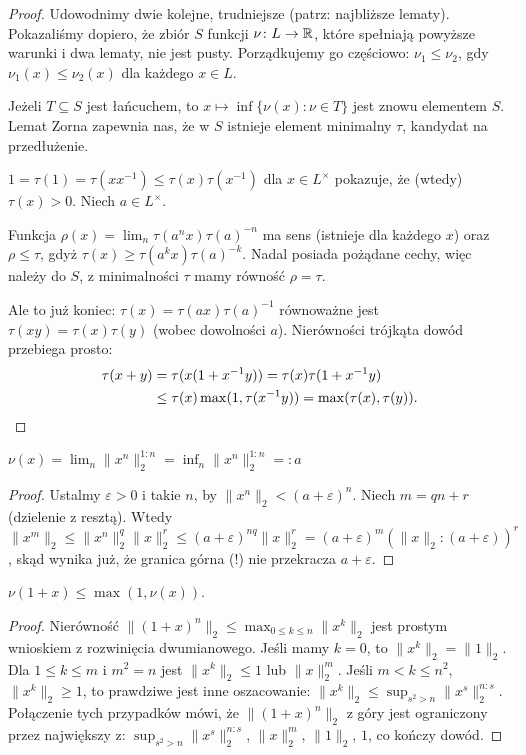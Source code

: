 \begin{proof}
	Udowodnimy dwie kolejne, trudniejsze (patrz: najbliższe lematy).
	Pokazaliśmy dopiero, że zbiór $S$ funkcji $\nu \colon L \to \mathbb R$, które spełniają powyższe warunki i dwa lematy, nie jest pusty.
	Porządkujemy go częściowo: $\nu_1 \le \nu_2$, gdy $\nu_1(x) \le \nu_2(x)$ dla każdego $x \in L$.
	
	Jeżeli $T \subseteq S$ jest łańcuchem, to $x \mapsto \inf \{\nu(x) : \nu \in T\}$ jest znowu elementem $S$.
	Lemat Zorna zapewnia nas, że w $S$ istnieje element minimalny $\tau$, kandydat na przedłużenie.

	$1 = \tau(1) = \tau(xx^{-1}) \le \tau(x) \tau(x^{-1})$ dla $x \in L^\times$ pokazuje, że (wtedy) $\tau (x) > 0$.
	Niech $a \in L^\times$.
	
	Funkcja $\rho(x) = \lim_n \tau(a^nx)\tau(a)^{-n}$ ma sens (istnieje dla każdego $x$) oraz $\rho \le \tau$, gdyż $\tau(x) \ge \tau(a^kx)\tau(a)^{-k}$.
	Nadal posiada pożądane cechy, więc należy do $S$, z minimalności $\tau$ mamy równość $\rho = \tau$.
	
	Ale to już koniec: $\tau(x) = \tau(ax) \tau(a)^{-1}$ równoważne jest $\tau(xy) = \tau(x) \tau(y)$ (wobec dowolności $a$).
	Nierówności trójkąta dowód przebiega prosto:
	\begin{align*}
		\tau(x + y) & = \tau(x(1 + x^{-1}y)) = \tau(x) \tau(1 + x^{-1}y) \\
		& \le \tau(x) \max (1, \tau(x^{-1}y))  = \max(\tau(x), \tau(y)). \qedhere
	\end{align*}
\end{proof}

\begin{lemat}
	$\nu(x) = \lim_n \|x^n\|_2^{1:n} = \inf_n \|x^n\|_2^{1:n} =: a$
\end{lemat}

\begin{proof}
	Ustalmy $\varepsilon > 0$ i takie $n$, by $\|x^n\|_2 < (a + \varepsilon)^n$.
	Niech $m = qn + r$ (dzielenie z resztą).
	Wtedy $\|x^m\|_2 \le \|x^n\|_2^q \|x\|_2^r \le (a + \varepsilon)^{nq} \|x\|_2^r = (a + \varepsilon)^m (\|x\|_2 : (a + \varepsilon))^r$,
	skąd wynika już, że granica górna (!) nie przekracza $a + \varepsilon$.
\end{proof}

\begin{lemat}
	$\nu(1 + x) \le \max(1, \nu(x))$.
\end{lemat}

\begin{proof}
Nierówność $\|(1 + x)^n\|_2 \le \max_{0 \le k \le n} \|x^k\|_2$ jest prostym wnioskiem z rozwinięcia dwumianowego.
Jeśli mamy $k = 0$, to $\|x^k\|_2 = \|1\|_2$.
Dla $1 \le k \le m$ i $m^2 = n$ jest $\|x^k\|_2 \le 1$ lub  $\|x\|_2^m$.
Jeśli $m < k \le n^2$, $\|x^k\|_2 \ge 1$, to prawdziwe jest inne oszacowanie: $\|x^k\|_2 \le \sup_{s^2 > n} \|x^s\|_2^{n:s}$.
Połączenie tych przypadków mówi, że $\|(1+x)^n\|_2$ z góry jest ograniczony przez największy z: $\sup_{s^2 > n} \|x^s\|_2^{n:s}$, $\|x\|_2^m$, $\|1\|_2$, $1$, co kończy dowód.
\end{proof}

